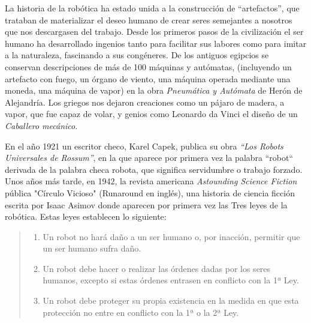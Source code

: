 La historia de la robótica ha estado unida a la construcción de “artefactos”, que trataban de materializar el deseo humano de crear seres semejantes a nosotros que nos descargasen del trabajo. Desde los primeros pasos de la civilización el ser humano ha desarrollado ingenios tanto para facilitar sus labores como para imitar a la naturaleza, fascinando a sus congéneres. De los antiguos egipcios se conservan descripciones de más de 100 máquinas y autómatas, (incluyendo un artefacto con fuego, un órgano de viento, una máquina operada mediante una moneda, una máquina de vapor) en la obra \textit{Pneumática y Autómata} de Herón de Alejandría. Los griegos nos dejaron creaciones como un pájaro de madera, a vapor, que fue capaz de volar, y genios como Leonardo da Vinci el diseño de un \textit{Caballero mecánico}. 

En el año 1921 un escritor checo, Karel Capek, publica su obra \textit{“Los Robots Universales de Rossum”}, en la que aparece por primera vez la palabra “robot“ derivada de la palabra checa robota, que significa servidumbre o trabajo forzado. Unos años más tarde, en 1942, la revista americana \textit{Astounding Science Fiction} pública "Círculo Vicioso" (Runaround en inglés), una historia de ciencia ficción escrita por Isaac Asimov donde aparecen por primera vez las Tres leyes de la robótica. Estas leyes establecen lo siguiente:
\begin{quote}
\begin{enumerate}[1.ª]
	\item Un robot no hará daño a un ser humano o, por inacción, permitir que un ser humano sufra daño.
	\item Un robot debe hacer o realizar las órdenes dadas por los seres humanos, excepto si estas órdenes entrasen en conflicto con la 1ª Ley.
	\item Un robot debe proteger su propia existencia en la medida en que esta protección no entre en conflicto con la 1ª o la 2ª Ley.
\end{enumerate}
\end{quote}

